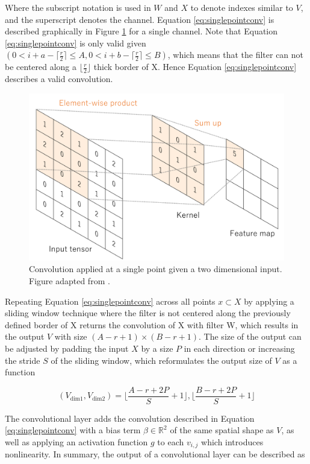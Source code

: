 \documentclass[../main/thesis.tex]{subfiles}
\begin{document}
Where the subscript notation is used in $W$ and $X$ to denote indexes similar to $V$, and the superscript denotes the channel. Equation \ref{eq:singlepointconv} is described graphically in Figure \ref{fig:convlayer} for a single channel. Note that Equation \ref{eq:singlepointconv} is only valid given $(0 < i + a - \lceil \frac{r}{2} \rceil \leq A, 0 < i + b - \lceil \frac{r}{2} \rceil \leq B)$, which means that the filter can not be centered along a $\lfloor \frac{r}{2} \rfloor$ thick border of X. Hence Equation \ref{eq:singlepointconv} describes a valid convolution.

\begin{figure}
    \centering
    \includegraphics[width=.6\textwidth]{convlayer}
    \caption{\label{fig:convlayer}Convolution applied at a single point given a two dimensional input. Figure adapted from \protect\citet{Yamashita2018}.}
\end{figure}

Repeating Equation \ref{eq:singlepointconv} across all points $x \subset X$ by applying a sliding window technique where the filter is not centered along the previously defined border of X returns the convolution of X with filter W, which results in the output $V$ with size $(A-r+1) \times (B-r+1)$. The size of the output can be adjusted by padding the input $X$ by a size $P$ in each direction or increasing the stride $S$ of the sliding window, which reformulates the output size of $V$ as a function

\begin{equation}
    \label{eq:outputdim}
    (V_\text{dim1}, V_\text{dim2}) = \lfloor\frac{A - r + 2P}{S} + 1\rfloor, \lfloor\frac{B - r + 2P}{S} + 1\rfloor
\end{equation}

The convolutional layer adds the convolution described in Equation \ref{eq:singlepointconv} with a bias term $\beta \in{\mathbb{R}^2}$ of the same spatial shape as $V$, as well as applying an activation function $g$ to each $v_{i,j}$ which introduces nonlinearity. In summary, the output of a convolutional layer can be described as 
\end{document}
